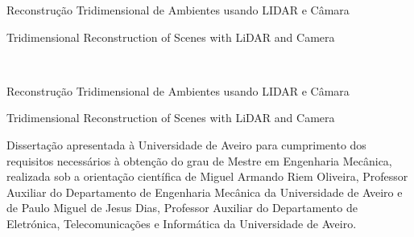 
\TitlePage
\HEADER{\BAR}{\ThesisYear}

      {Reconstrução Tridimensional de Ambientes usando LIDAR e Câmara}
      
\vspace*{5mm}

\TITLE{}
      {Tridimensional Reconstruction of Scenes with LiDAR and Camera}

%
%

\EndTitlePage
\titlepage\ \endtitlepage


\TitlePage
\HEADER{}{\ThesisYear}
      {Reconstrução Tridimensional de Ambientes usando LIDAR e Câmara}
      
\vspace*{5mm}

\TITLE{}
      {Tridimensional Reconstruction of Scenes with LiDAR and Camera}
\vspace*{15mm}

\TEXT{}
     {Dissertação apresentada à Universidade de Aveiro para cumprimento dos requisitos necessários à obtenção do grau de Mestre em Engenharia Mecânica, realizada sob a orientação científica de Miguel Armando Riem Oliveira, Professor Auxiliar do Departamento de Engenharia Mecânica da Universidade de Aveiro e de Paulo Miguel de Jesus Dias, Professor Auxiliar do Departamento de Eletrónica, Telecomunicações e Informática da Universidade de Aveiro.}
\EndTitlePage
\titlepage\ \endtitlepage

